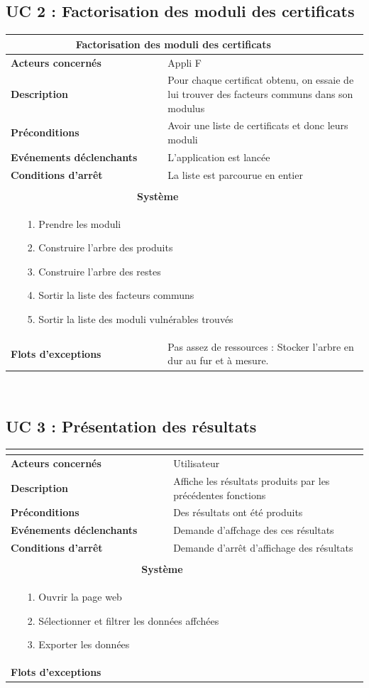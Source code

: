\documentclass[a4paper,11pt,french]{article}
\newcommand{\fiche}[9] {
	\noindent
\begin{tabular}{|p{4cm}| p{2cm} | p{4cm} | p{.5cm} | p{7cm}|} 
\hline
\rowcolor{blue}
\multicolumn{2}{|l|}{\color{white}\bfseries{Nom}} & \multicolumn{3}{l|}{\color{white}\bfseries{#1}}\\
\hline
\multicolumn{2}{|l|}{\bfseries{Acteurs concernés}} & \multicolumn{3}{m{10.5cm}|}{#2}\\
\hline
\multicolumn{2}{|l|}{\bfseries{Description}} & \multicolumn{3}{m{10.5cm}|}{#3}\\
\hline
\multicolumn{2}{|l|}{\bfseries{Préconditions}} & \multicolumn{3}{m{10.5cm}|}{#4}\\
\hline
\multicolumn{2}{|l|}{\bfseries{Evénements déclenchants}} & \multicolumn{3}{m{10.5cm}|}{#5}\\
\hline
\multicolumn{2}{|l|}{\bfseries{Conditions d'arrêt}} & \multicolumn{3}{m{10.5cm}|}{#6}\\
\hline
\rowcolor{gray}
\multicolumn{5}{|c|}{\bfseries{Description du flot d'événements principal}}\\
\hline
\rowcolor{gray}
\multicolumn{3}{|c|}{\bfseries{Acteur(s)}} & \multicolumn{2}{c|}{\bfseries{Système}}\\
\hline
\multicolumn{3}{|p{7.5cm}|}{#7} & \multicolumn{2}{p{7.5cm}|}{#8}\\
\hline
\multicolumn{2}{|l}{\bfseries{Flots d'exceptions}} & \multicolumn{3}{|p{11.5cm}|}{#9}\\
\hline
\end{tabular}
\\
}
\begin{document}
\subsection{UC 2 : Factorisation des moduli des certificats}

\fiche
	{Factorisation des moduli des certificats} %
	{Appli F} %
	{Pour chaque certificat obtenu, on essaie de lui trouver des facteurs communs dans son modulus} %
	{Avoir une liste de certificats et donc leurs moduli} %
	{L'application est lancée} %
	{La liste est parcourue en entier} %
	{\begin{itemize}  %
		\item [1.] Prendre les moduli
		\item [2.] Construire l'arbre des produits
		\item [3.] Construire l'arbre des restes
		\item [4.] Sortir la liste des facteurs communs
		\item [5.] Sortir la liste des moduli vulnérables trouvés
	 \end{itemize}
	} 
	{\begin{itemize}  %
		\item []
		\item []
	\end{itemize}
	 }
	{Pas assez de ressources : Stocker l'arbre en dur au fur et à mesure.} %


\subsection{UC 3 : Présentation des résultats}

\fiche
	{} %
	{Utilisateur} %
	{Affiche les résultats produits par les précédentes fonctions} %
	{Des résultats ont été produits} %
	{Demande d'affchage des ces résultats} %
	{Demande d'arrêt d'affichage des résultats} %
	{\begin{itemize}  %
		\item [1.] Ouvrir la page web
		\item [2.] Sélectionner et filtrer les données affchées
		\item [3.] Exporter les données
	 \end{itemize}
	} 
	{\begin{itemize}  %
		\item []
		\item []
	\end{itemize}
	 }
	{} %
\end{document}
